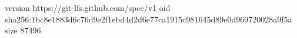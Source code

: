 version https://git-lfs.github.com/spec/v1
oid sha256:1bc8e1883d6c76d9e2f1ebd4d2d6e77ca1915c981645d89e0d969720028a9f5a
size 87496
